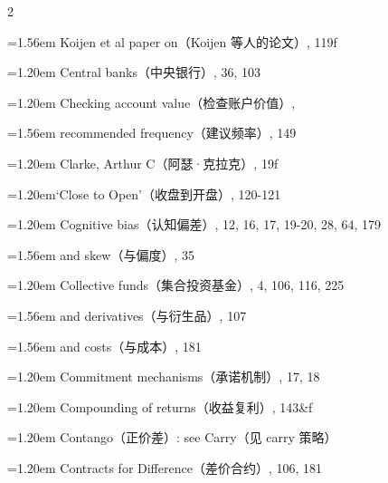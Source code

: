 {\begin{multicols}{2}
\par \noindent\hangindent=1.56em\hspace*{0.36em} Koijen et al paper on（Koijen 等人的论文）, 119f
\par \noindent\hangindent=1.20em\hspace*{0.00em} Central banks（中央银行）, 36, 103
\par \noindent\hangindent=1.20em\hspace*{0.00em} Checking account value（检查账户价值）,
\par \noindent\hangindent=1.56em\hspace*{0.36em} recommended frequency（建议频率）, 149
\par \noindent\hangindent=1.20em\hspace*{0.00em} Clarke, Arthur C（阿瑟·克拉克）, 19f
\par \noindent\hangindent=1.20em\hspace*{0.00em}‘Close to Open’（收盘到开盘）, 120-121
\par \noindent\hangindent=1.20em\hspace*{0.00em} Cognitive bias（认知偏差）, 12, 16, 17, 19-20, 28, 64, 179
\par \noindent\hangindent=1.56em\hspace*{0.36em} and skew（与偏度）, 35
\par \noindent\hangindent=1.20em\hspace*{0.00em} Collective funds（集合投资基金）, 4, 106, 116, 225
\par \noindent\hangindent=1.56em\hspace*{0.36em} and derivatives（与衍生品）, 107
\par \noindent\hangindent=1.56em\hspace*{0.36em} and costs（与成本）, 181
\par \noindent\hangindent=1.20em\hspace*{0.00em} Commitment mechanisms（承诺机制）, 17, 18
\par \noindent\hangindent=1.20em\hspace*{0.00em} Compounding of returns（收益复利）, 143\&f
\par \noindent\hangindent=1.20em\hspace*{0.00em} Contango（正价差）: see Carry（见 carry 策略）
\par \noindent\hangindent=1.20em\hspace*{0.00em} Contracts for Difference（差价合约）, 106, 181

\end{multicols}}
